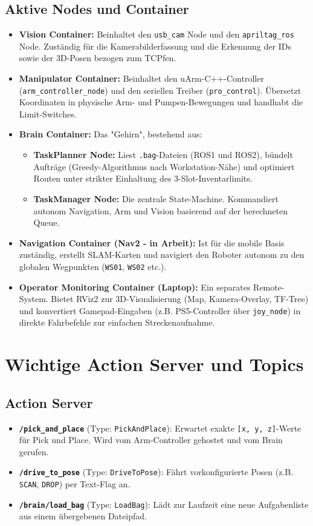 \documentclass[12pt,a4paper]{article}
\begin{document}
\subsection{Aktive Nodes und Container}
\begin{itemize}
    \item \textbf{Vision Container:} Beinhaltet den \texttt{usb\_cam} Node und den \texttt{apriltag\_ros} Node. Zuständig für die Kamerabilderfassung und die Erkennung der IDs sowie der 3D-Posen bezogen zum TCPfen.
    \item \textbf{Manipulator Container:} Beinhaltet den uArm-C++-Controller (\texttt{arm\_controller\_node}) und den seriellen Treiber (\texttt{pro\_control}). Übersetzt Koordinaten in physische Arm- und Pumpen-Bewegungen und handhabt die Limit-Switches.
    \item \textbf{Brain Container:} Das "Gehirn", bestehend aus:
    \begin{itemize}
        \item \textbf{TaskPlanner Node:} Liest \texttt{.bag}-Dateien (ROS1 und ROS2), bündelt Aufträge (Greedy-Algorithmus nach Workstation-Nähe) und optimiert Routen unter strikter Einhaltung des 3-Slot-Inventarlimits.
        \item \textbf{TaskManager Node:} Die zentrale State-Machine. Kommandiert autonom Navigation, Arm und Vision basierend auf der berechneten Queue.
    \end{itemize}
    \item \textbf{Navigation Container (Nav2 - in Arbeit):} Ist für die mobile Basis zuständig, erstellt SLAM-Karten und navigiert den Roboter autonom zu den globalen Wegpunkten (\texttt{WS01}, \texttt{WS02} etc.).
    \item \textbf{Operator Monitoring Container (Laptop):} Ein separates Remote-System. Bietet RViz2 zur 3D-Visualisierung (Map, Kamera-Overlay, TF-Tree) und konvertiert Gamepad-Eingaben (z.B. PS5-Controller über \texttt{joy\_node}) in direkte Fahrbefehle zur einfachen Streckenaufnahme.
\end{itemize}

\section{Wichtige Action Server und Topics}
\subsection{Action Server}
\begin{itemize}
    \item \textbf{\texttt{/pick\_and\_place}} (Type: \texttt{PickAndPlace}): Erwartet exakte \texttt{[x, y, z]}-Werte für Pick und Place. Wird vom Arm-Controller gehostet und vom Brain gerufen.
    \item \textbf{\texttt{/drive\_to\_pose}} (Type: \texttt{DriveToPose}): Fährt vorkonfigurierte Posen (z.B. \texttt{SCAN}, \texttt{DROP}) per Text-Flag an.
    \item \textbf{\texttt{/brain/load\_bag}} (Type: \texttt{LoadBag}): Lädt zur Laufzeit eine neue Aufgabenliste aus einem übergebenen Dateipfad.
\end{itemize}
\end{document}
